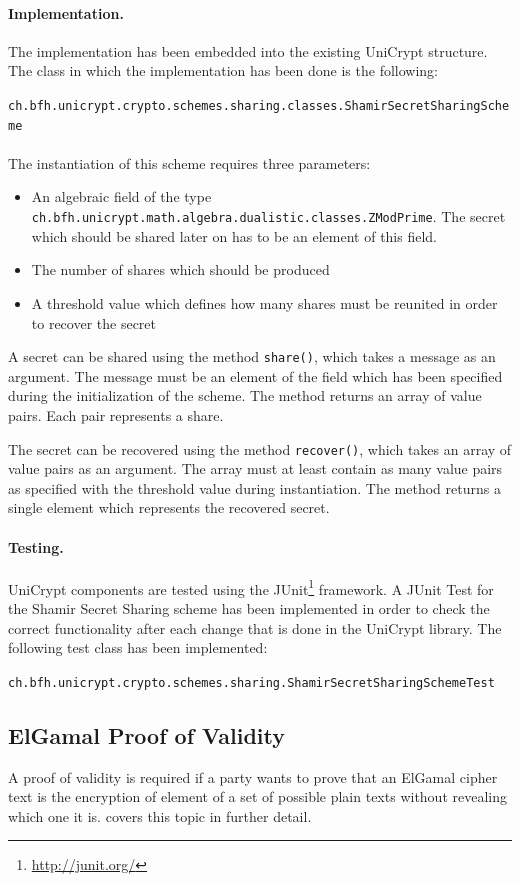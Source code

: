 \documentclass[numbers=noenddot, abstract=on, a4paper, headsepline,
footsepline, oneside, openright, draft=off, listof=leveldown]{scrreprt}
\begin{document}
\paragraph{Implementation.} The implementation has been embedded into the
existing UniCrypt structure.
The class in which the implementation has been done is the following:

\texttt{ch.bfh.unicrypt.crypto.schemes.sharing.classes.ShamirSecretSharingScheme}
\\
\\
The instantiation of this scheme requires three parameters:
\begin{itemize}
  \item An algebraic field of the type \\
  \texttt{ch.bfh.unicrypt.math.algebra.dualistic.classes.ZModPrime}. The secret
  which should be shared later on has to be an element of this field.
  \item The number of shares which should be produced
  \item A threshold value which defines how many shares must be reunited in
  order to recover the secret
\end{itemize}

A secret can be shared using the method \texttt{share()}, which takes
a message as an argument. The message must be an element of the field which has
been specified during the initialization of the scheme. The method returns an
array of value pairs. Each pair represents a share.

The secret can be recovered using the method \texttt{recover()}, which takes an
array of value pairs as an argument. The array must at least contain as many
value pairs as specified with the threshold value during instantiation. The
method returns a single element which represents the recovered secret.

\paragraph{Testing.}
UniCrypt components are tested using the JUnit\footnote{\url{http://junit.org/}}
framework. A JUnit Test for the Shamir Secret Sharing scheme has been implemented in order to check the correct
functionality after each change that is done in the UniCrypt library. The
following test class has been implemented:

\texttt{ch.bfh.unicrypt.crypto.schemes.sharing.ShamirSecretSharingSchemeTest}

\subsection{ElGamal Proof of Validity}
A proof of validity is required if a party wants to prove that an ElGamal
cipher text is the encryption of element of a set of possible plain texts without
revealing which one it is.  covers this topic in
further detail.
\end{document}
